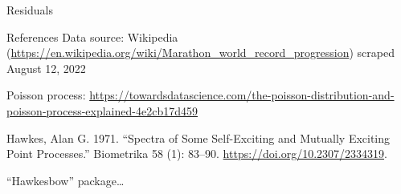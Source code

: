 \documentclass[
  ignorenonframetext,
]{beamer}
\begin{document}
\begin{frame}{Residuals}
\protect\hypertarget{residuals}{}
\end{frame}

\begin{frame}{References}
\protect\hypertarget{references}{}
Data source: Wikipedia
(\url{https://en.wikipedia.org/wiki/Marathon_world_record_progression})
scraped August 12, 2022

Poisson process:
\url{https://towardsdatascience.com/the-poisson-distribution-and-poisson-process-explained-4e2cb17d459}

Hawkes, Alan G. 1971. ``Spectra of Some Self-Exciting and Mutually
Exciting Point Processes.'' Biometrika 58 (1): 83--90.
\url{https://doi.org/10.2307/2334319}.

``Hawkesbow'' package\ldots{}
\end{frame}
\end{document}
